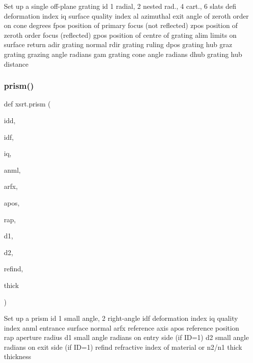 \begin{DoxyVerb}Set up a single off-plane grating
   id       1 radial, 2 nested rad., 4 cart., 6 slats
   defi     deformation index
   iq       surface quality index
   al       azimuthal exit angle of zeroth order on cone degrees
   fpos     position of primary focus (not reflected)
   zpos     position of zeroth order focus (reflected)
   gpos     position of centre of grating
   alim     limits on surface
return
   adir     grating normal
   rdir     grating ruling
   dpos     grating hub
   graz     grating grazing angle radians
   gam      grating cone angle radians
   dhub     grating hub distance
\end{DoxyVerb}
 \mbox{\label{namespacexsrt_a890f1fc1330fae1199190ea87f534a0e}} 
\subsubsection{\texorpdfstring{prism()}{prism()}}
{\footnotesize\ttfamily def xsrt.\+prism (\begin{DoxyParamCaption}\item[{}]{idd,  }\item[{}]{idf,  }\item[{}]{iq,  }\item[{}]{anml,  }\item[{}]{arfx,  }\item[{}]{apos,  }\item[{}]{rap,  }\item[{}]{d1,  }\item[{}]{d2,  }\item[{}]{refind,  }\item[{}]{thick }\end{DoxyParamCaption})}

\begin{DoxyVerb}Set up a prism
    id     1 small angle, 2 right-angle
    idf    deformation index
    iq     quality index
    anml   entrance surface normal 
    arfx   reference axis
    apos   reference position
    rap    aperture radius
    d1     small angle radians on entry side (if ID=1)
    d2     small angle radians on exit side (if ID=1)
    refind refractive index of material or n2/n1
    thick  thickness
\end{DoxyVerb}
 \mbox{\label{namespacexsrt_a61fb0678aef45eb10653ef734566d879}} 
